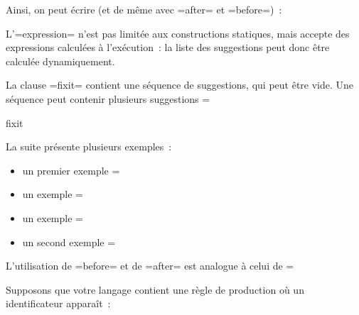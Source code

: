 Ainsi, on peut écrire (et de même avec \ggs=after= et \ggs=before=)~:


L'\ggs=expression= n'est pas limitée aux constructions statiques, mais accepte des expressions calculées à l'exécution~: la liste des suggestions peut donc être calculée dynamiquement.

La clause \ggs=fixit= contient une séquence de suggestions, qui peut être vide. Une séquence peut contenir plusieurs suggestions \ggs=%
\begin{galgas}
fixit {
}
\end{galgas}


La suite présente plusieurs exemples~:
\begin{itemize}
  \item un premier exemple \ggs=%
  \item un exemple  \ggs=%
  \item un exemple \ggs=%
  \item un second exemple \ggs=%
\end{itemize}

L'utilisation de \ggs=before= et de \ggs=after= est analogue à celui de \ggs=%



Supposons que votre langage contient une règle de production où un identificateur apparaît~:

